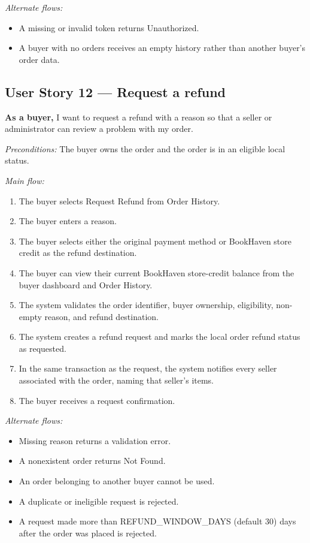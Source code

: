 \documentclass[11pt]{scrreprt}
\begin{document}
\textit{Alternate flows:}
\begin{itemize}
\item A missing or invalid token returns Unauthorized.
\item A buyer with no orders receives an empty history rather than another
buyer's order data.
\end{itemize}

\subsection{User Story 12 --- Request a refund}
\textbf{As a buyer,} I want to request a refund with a reason so that a seller
or administrator can review a problem with my order.

\textit{Preconditions:} The buyer owns the order and the order is in an
eligible local status.

\textit{Main flow:}
\begin{enumerate}
\item The buyer selects Request Refund from Order History.
\item The buyer enters a reason.
\item The buyer selects either the original payment method or BookHaven store
credit as the refund destination.
\item The buyer can view their current BookHaven store-credit balance from the
buyer dashboard and Order History.
\item The system validates the order identifier, buyer ownership, eligibility,
non-empty reason, and refund destination.
\item The system creates a refund request and marks the local order refund
status as requested.
\item In the same transaction as the request, the system notifies every seller
associated with the order, naming that seller's items.
\item The buyer receives a request confirmation.
\end{enumerate}

\textit{Alternate flows:}
\begin{itemize}
\item Missing reason returns a validation error.
\item A nonexistent order returns Not Found.
\item An order belonging to another buyer cannot be used.
\item A duplicate or ineligible request is rejected.
\item A request made more than REFUND\_WINDOW\_DAYS (default 30) days after the
order was placed is rejected.
\end{itemize}
\end{document}
